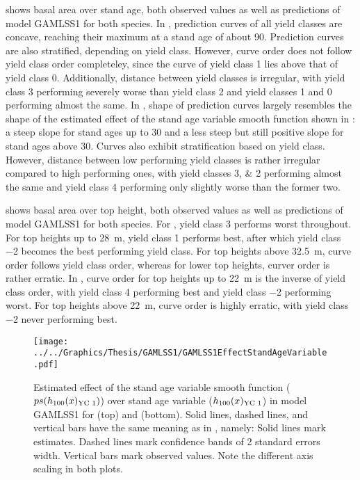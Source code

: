  shows basal area over stand age, both observed values as well as predictions of model GAMLSS1 for both species.  In \Beech{}, prediction curves of all yield classes are concave, reaching their maximum at a stand age of about \SI{90}{\year}.  Prediction curves are also stratified, depending on yield class.  However, curve order does not follow yield class order completeley, since the curve of yield class \num{1} lies above that of yield class \num{0}.  Additionally, distance between yield classes is irregular, with yield class \num{3} performing severely worse than yield class \num{2} and yield classes \num{1} and \num{0} performing almost the same.  In \Spruce{}, shape of prediction curves largely resembles the shape of the estimated effect of the stand age variable smooth function shown in :  a steep slope for stand ages up to \SI{30}{\year} and a less steep but still positive slope for stand ages above \SI{30}{\year}.  Curves also exhibit stratification based on yield class.  However, distance between low performing yield classes is rather irregular compared to high performing ones, with yield classes \numlist{3;2} performing almost the same and yield class \num{4} performing only slightly worse than the former two.

 shows basal area over top height, both observed values as well as predictions of model GAMLSS1 for both species.  For \Beech{}, yield class \num{3} performs worst throughout.  For top heights up to \SI{28}{\meter}, yield class \num{1} performs best, after which yield class \num{-2} becomes the best performing yield class.  For top heights above \SI{32.5}{\meter}, curve order follows yield class order, whereas for lower top heights, curver order is rather erratic.  In \Spruce{}, curve order for top heights up to \SI{22}{\meter} is the inverse of yield class order, with yield class \num{4} performing best and yield class \num{-2} performing worst.  For top heights above \SI{22}{\meter}, curve order is highly erratic, with yield class \num{-2} never performing best.

\begin{figure}[h]
  \centering
  \texttt{[image: ../../Graphics/Thesis/GAMLSS1/GAMLSS1EffectStandAgeVariable.pdf]}
  \caption{Estimated effect of the stand age variable smooth function (\(ps(h_{100}(x)_{\text{YC 1}}{})\)) over stand age variable (\(h_{100}(x)_{\text{YC 1}}{}\)) in model GAMLSS1 for \Beech{} (top) and \Spruce{} (bottom).  Solid lines, dashed lines, and vertical bars have the same meaning as in , namely:  Solid lines mark estimates.  Dashed lines mark confidence bands of 2 standard errors width.  Vertical bars mark observed values.  Note the different axis scaling in both plots.}
  \label{fig:GAMLSS1EffectStandAgeVariable}
\end{figure}

